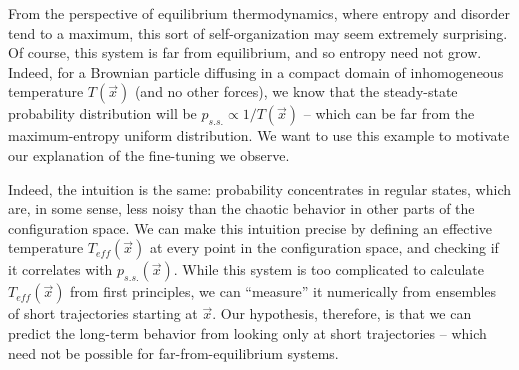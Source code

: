 \documentclass[reprint,prx]{revtex4-1}
\renewcommand{\v}[1]{\ensuremath{\vec{#1}}} %
\renewcommand{\=}[1]{\stackrel{#1}{=}} %
\renewcommand{\(}{\left (}
\renewcommand{\)}{\right  )}
\renewcommand{\[}{\left [}
\renewcommand{\]}{\right ]}
\newcommand{\<}{\left <}
\renewcommand{\>}{\right >}
\theoremstyle{definition}
\theoremstyle{remark}
\renewcommand{\todo}[1]{\textit{\color{red}[#1]}}
\begin{document}
From the perspective of equilibrium thermodynamics, where entropy and disorder tend to a maximum, this sort of self-organization may seem extremely surprising. Of course, this system is far from equilibrium, and so entropy need not grow. Indeed, for a Brownian particle diffusing in a compact domain of inhomogeneous temperature $ T(\v{x}) $ (and no other forces), we know that the steady-state probability distribution will be $ p_{s.s.} \propto 1/T(\v{x}) $ -- which can be far from the maximum-entropy uniform distribution. We want to use this example to motivate our explanation of the fine-tuning we observe.

Indeed, the intuition is the same: probability concentrates in regular states, which are, in some sense, less noisy than the chaotic behavior in other parts of the configuration space. We can make this intuition precise by defining an effective temperature $ T_{eff}(\v{x}) $ at every point in the configuration space, and checking if it correlates with $ p_{s.s.}(\v{x}) $. While this system is too complicated to calculate $ T_{eff} (\v{x})$ from first principles, we can ``measure'' it numerically from ensembles of short trajectories starting at $ \v{x} $. Our hypothesis, therefore, is that we can predict the long-term behavior from looking only at short trajectories -- which need not be possible for far-from-equilibrium systems. 

\end{document}
